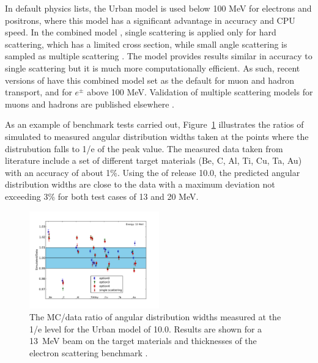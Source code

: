 In default physics lists, the Urban model is used below 100 MeV for electrons 
and positrons, where this model has a significant advantage in accuracy and 
CPU speed.  In the combined model , single scattering 
is applied only for hard scattering, which has a limited cross section, while
small angle scattering is sampled as multiple scattering \cite{embib:msc1}. 
The  model provides results similar in accuracy to 
single scattering but it is much more computationally efficient.  As such, 
recent versions of \Gfour{} have this combined model set as the default for muon
and hadron transport, and for $e^{\pm}$ above 100 MeV.  Validation of multiple
scattering models for muons and hadrons are published elsewhere 
\cite{embib:chep14,embib:chep11,embib:msc1,embib:msc12}.

As an example of benchmark tests carried out, Figure~\ref{Figure-MSC1} 
illustrates the ratios of simulated to measured angular distribution widths
taken at the points where the distrubution falls to 1/e of the peak value.  The
measured data taken from literature \cite{embib:msc11} include a set of 
different target materials (Be, C, Al, Ti, Cu, Ta, Au) with an accuracy of about
1\%.  Using the  of \Gfour{} release 10.0, the predicted 
angular distribution widths are close to the data with a maximum deviation not 
exceeding 3\% for both test cases of 13 and 20 MeV. 

\begin{figure}
\includegraphics[width=0.5\textwidth]{figures/ratio_13.pdf}
\caption{The MC/data ratio of angular distribution widths measured at the 1/e
level for the Urban model of \Gfour{} 10.0.  Results are shown for a 13~MeV beam
on the target materials and thicknesses of the electron scattering benchmark
\cite{embib:msc11} .}
\label{Figure-MSC1}
\end{figure}


